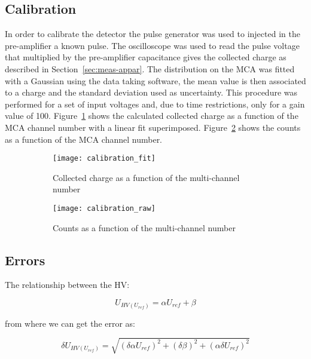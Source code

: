 \subsection{Calibration}
\label{sec:calibration}
In order to calibrate the detector the pulse generator was used to injected in
the pre-amplifier a known pulse. The oscilloscope was used to read the pulse
voltage that multiplied by the pre-amplifier capacitance gives the collected
charge as described in Section~\ref{sec:meas-appar}. The distribution on the MCA
was fitted with a Gaussian using the data taking software, the mean value is
then associated to a charge and the standard deviation used as uncertainty. This
procedure was performed for a set of input voltages and, due to time
restrictions, only for a gain value of 100. Figure~\ref{fig:calibration_fit}
shows the calculated collected charge as a function of the MCA channel number
with a linear fit superimposed. Figure~\ref{fig:calibration_raw} shows the
counts as a function of the MCA channel number.
\begin{figure}[!h]
  \centering
  \begin{subfigure}[t]{.48\linewidth}
    \texttt{[image: calibration\_fit]}
    \caption{Collected charge as a function of the multi-channel number}
    \label{fig:calibration_fit}
  \end{subfigure}
  \begin{subfigure}[t]{.48\linewidth}
    \texttt{[image: calibration\_raw]}
    \caption{Counts as a function of the multi-channel number}
    \label{fig:calibration_raw}
  \end{subfigure}
  \caption{}
  \label{fig:calibration}
\end{figure}

\subsection{Errors}


The relationship between the HV:

\begin{equation}
  U_{HV(U_{ref})} = \alpha U_{ref} + \beta
\end{equation}

from where we can get the error as:

\begin{equation}
  \delta U_{HV(U_{ref})} = \sqrt{ (\delta \alpha  U_{ref})^2 + (\delta \beta)^2 + (\alpha \delta U_{ref})^2 }
\end{equation}

